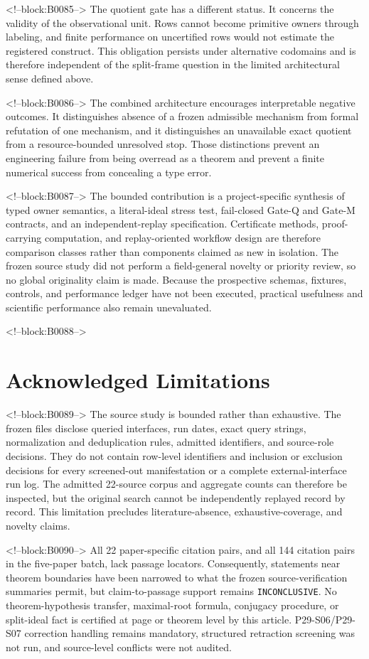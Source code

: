 \documentclass[11pt,a4paper]{article}
\begin{document}
<!--block:B0085-->
The quotient gate has a different status. It concerns the validity of the observational unit. Rows cannot become primitive owners through labeling, and finite performance on uncertified rows would not estimate the registered construct. This obligation persists under alternative codomains and is therefore independent of the split-frame question in the limited architectural sense defined above.

<!--block:B0086-->
The combined architecture encourages interpretable negative outcomes. It distinguishes absence of a frozen admissible mechanism from formal refutation of one mechanism, and it distinguishes an unavailable exact quotient from a resource-bounded unresolved stop. Those distinctions prevent an engineering failure from being overread as a theorem and prevent a finite numerical success from concealing a type error.

<!--block:B0087-->
The bounded contribution is a project-specific synthesis of typed owner semantics, a literal-ideal stress test, fail-closed Gate-Q and Gate-M contracts, and an independent-replay specification. Certificate methods, proof-carrying computation, and replay-oriented workflow design are therefore comparison classes rather than components claimed as new in isolation. The frozen source study did not perform a field-general novelty or priority review, so no global originality claim is made. Because the prospective schemas, fixtures, controls, and performance ledger have not been executed, practical usefulness and scientific performance also remain unevaluated.

<!--block:B0088-->
\section{Acknowledged Limitations}

<!--block:B0089-->
The source study is bounded rather than exhaustive. The frozen files disclose queried interfaces, run dates, exact query strings, normalization and deduplication rules, admitted identifiers, and source-role decisions. They do not contain row-level identifiers and inclusion or exclusion decisions for every screened-out manifestation or a complete external-interface run log. The admitted 22-source corpus and aggregate counts can therefore be inspected, but the original search cannot be independently replayed record by record. This limitation precludes literature-absence, exhaustive-coverage, and novelty claims.

<!--block:B0090-->
All 22 paper-specific citation pairs, and all 144 citation pairs in the five-paper batch, lack passage locators. Consequently, statements near theorem boundaries have been narrowed to what the frozen source-verification summaries permit, but claim-to-passage support remains \texttt{INCONCLUSIVE}. No theorem-hypothesis transfer, maximal-root formula, conjugacy procedure, or split-ideal fact is certified at page or theorem level by this article. P29-S06/P29-S07 correction handling remains mandatory, structured retraction screening was not run, and source-level conflicts were not audited.
\end{document}
